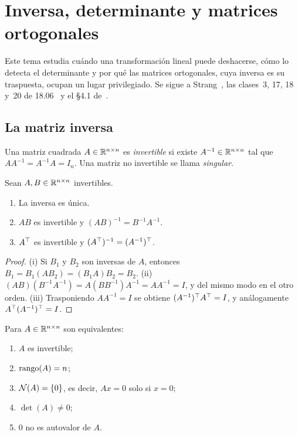 \chapter{Inversa, determinante y matrices ortogonales}
\label{tema:2}

Este tema estudia cuándo una transformación lineal puede deshacerse, cómo lo detecta el determinante y por qué las matrices ortogonales, cuya inversa es su traspuesta, ocupan un lugar privilegiado. Se sigue a Strang~\cite[§2.2, cap.~5 y §4.4]{strang-ila}, las clases~3, 17, 18 y~20 de 18.06~\cite{mit1806} y el §4.1 de~\cite{mml}.

\section{La matriz inversa}

\begin{definicion}[Inversa]
Una matriz cuadrada $A\in\mathbb{R}^{n\times n}$ es \emph{invertible} si existe $A^{-1}\in\mathbb{R}^{n\times n}$ tal que $AA^{-1}=A^{-1}A=I_n$. Una matriz no invertible se llama \emph{singular}.
\end{definicion}

\begin{proposicion}\label{prop:inversa-props}
Sean $A,B\in\mathbb{R}^{n\times n}$ invertibles.
\begin{enumerate}
  \item La inversa es única.
  \item $AB$ es invertible y $(AB)^{-1}=B^{-1}A^{-1}$.
  \item $A^{\top}$ es invertible y $(A^{\top})^{-1}=(A^{-1})^{\top}$.
\end{enumerate}
\end{proposicion}

\begin{proof}
(i) Si $B_1$ y $B_2$ son inversas de $A$, entonces $B_1=B_1(AB_2)=(B_1A)B_2=B_2$. (ii) $(AB)(B^{-1}A^{-1})=A(BB^{-1})A^{-1}=AA^{-1}=I$, y del mismo modo en el otro orden. (iii) Trasponiendo $AA^{-1}=I$ se obtiene $(A^{-1})^{\top} A^{\top}=I$, y análogamente $A^{\top}(A^{-1})^{\top}=I$.
\end{proof}

\begin{teorema}\label{teo:invertible}
Para $A\in\mathbb{R}^{n\times n}$ son equivalentes:
\begin{enumerate}
  \item $A$ es invertible;
  \item $\operatorname{rango}(A)=n$;
  \item $\mathcal{N}(A)=\{0\}$, es decir, $Ax=0$ solo si $x=0$;
  \item $\det(A)\ne 0$;
  \item $0$ no es autovalor de $A$.
\end{enumerate}
\end{teorema}

